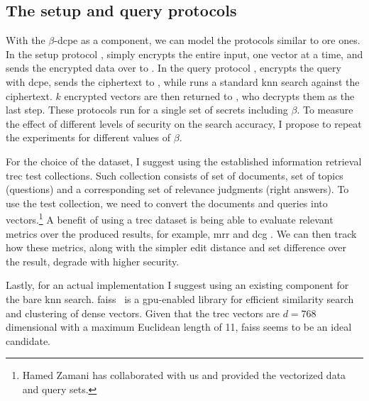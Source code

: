		\subsection{The setup and query protocols}

			With the $\beta$-\acrshort{dcpe} as a component, we can model the protocols similar to \acrshort{ore} ones.
			In the setup protocol \protocolSetup{}, \user{} simply encrypts the entire input, one vector at a time, and sends the encrypted data over to \server{}.
			In the query protocol \protocolQuery{}, \user{} encrypts the query with \acrshort{dcpe}, sends the ciphertext to \server{}, while \server{} runs a standard \acrshort{knn} search against the ciphertext.
			$k$ encrypted vectors are then returned to \user{}, who decrypts them as the last step.
			These protocols run for a single set of secrets including $\beta$.
			To measure the effect of different levels of security on the search accuracy, I propose to repeat the experiments for different values of $\beta$.

			For the choice of the dataset, I suggest using the established information retrieval \acrshort{trec} test collections.
			Such collection consists of set of documents, set of topics (questions) and a corresponding set of relevance judgments (right answers).
			To use the test collection, we need to convert the documents and queries into vectors.\footnote{
				Hamed Zamani has collaborated with us and provided the vectorized data and query sets.
			}
			A benefit of using a \acrshort{trec} dataset is being able to evaluate relevant metrics over the produced results, for example, \acrshort{mrr} \cite{mrr} and \acrshort{dcg} \cite{dcg}.
			We can then track how these metrics, along with the simpler edit distance and set difference over the result, degrade with higher security.

			Lastly, for an actual implementation I suggest using an existing component for the bare \acrshort{knn} search.
			\acrshort{faiss}~\cite{faiss} is a \acrshort{gpu}-enabled library for efficient similarity search and clustering of dense vectors.
			Given that the \acrshort{trec} vectors are $d = 768$ dimensional with a maximum Euclidean length of 11, \acrshort{faiss} seems to be an ideal candidate.
